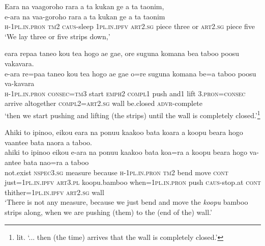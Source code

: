\ea\label{ex:text14-37}
Eara na vaagoroho rara a ta kukan ge a ta taonim,\\
\gll e-ara	na	vaa-goroho	rara	a	ta	kukan	ge	a	ta	taonim\\
     \textsc{h}-1\textsc{pl}.\textsc{in}.\textsc{pron}	\textsc{tm}2	\textsc{caus}-sleep	1\textsc{pl}.\textsc{in}.\textsc{ipfv}	\textsc{art}2.\textsc{sg}	piece	three	or	\textsc{art}2.\textsc{sg}	piece	five\\
\glt `We lay three or five strips down,'
\z

\ea\label{ex:text14-38}
eara repaa taneo kou tea hogo ae gae, ore suguna komana bea taboo poosu vakavara.\\
\gll e-ara	re=paa	taneo	kou	tea	hogo	ae	gae	o=re	suguna	komana	be=a	taboo	poosu	va-kavara\\
     \textsc{h}-1\textsc{pl}.\textsc{in}.\textsc{pron}	\textsc{consec}=\textsc{tm}3	start	\textsc{emph}2	\textsc{compl}1	push	and1	lift	3.\textsc{pron}=\textsc{consec}	arrive	altogether	\textsc{compl}2=\textsc{art}2.\textsc{sg}	wall	be.closed	\textsc{advr}-complete\\
\glt `then we start pushing and lifting (the strips) until the wall is completely closed.'\footnote{lit. `... then (the time) arrives that the wall is completely closed.'}
\z

\ea\label{ex:text14-39}
Ahiki to ipinoo, eikou eara na ponuu kaakoo bata koara a koopu beara hogo vaantee bata naora a taboo.\\
\gll ahiki	to	ipinoo	eikou	e-ara	na	ponuu	kaakoo	bata	koa=ra	a	koopu	beara	hogo	va-antee	bata	nao=ra	a	taboo\\
     not.exist	\textsc{nspec}3.\textsc{sg}	measure	because	\textsc{h}-1\textsc{pl}.\textsc{in}.\textsc{pron}	\textsc{tm}2	bend	move	\textsc{cont}	just=1\textsc{pl}.\textsc{in}.\textsc{ipfv}	\textsc{art}3.\textsc{pl}	koopu.bamboo	when=1\textsc{pl}.\textsc{in}.\textsc{pron}	push	\textsc{caus}-stop.at	\textsc{cont}	thither=1\textsc{pl}.\textsc{in}.\textsc{ipfv}	\textsc{art}2.\textsc{sg}	wall\\
\glt `There is not any measure, because we just bend and move the \textit{koopu} bamboo strips along, when we are pushing (them) to the (end of the) wall.'
\z

